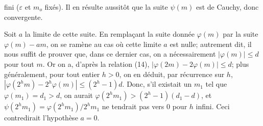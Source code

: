 fini ($\varepsilon$ et $m_o$ fixés). Il en résulte aussitôt que la suite $\psi(m)$ est de Cauchy, donc convergente.

Soit $a$ la limite de cette suite. En remplaçant la suite donnée $\varphi(m)$ par la suite $\varphi(m)-am$, on se ramène au cas où cette limite $a$ est nulle; autrement dit, il nous suffit de prouver que, dans ce dernier cas, on a nécessairement $|\varphi(m)|\leq d$ pour tout $m$. Or on a, d'après la relation (14), $|\varphi(2m)-2\varphi(m)|\leq d$; plus généralement, pour tout entier $h>0$, on en déduit, par récurrence sur $h$, $|\varphi(2^hm)-2^h\varphi(m)|\leq(2^h-1)d$. Donc, s'il existait un $m_1$ tel que $\varphi(m_1)=d_1>d$, on aurait $\varphi(2^hm_1)>(2^h-1)(d_1-d)$, et $\psi(2^hm_1)=\varphi(2^hm_1)/2^hm_1$ ne tendrait pas vers $0$ pour $h$ infini. Ceci contredirait l'hypothèse $a=0$.
